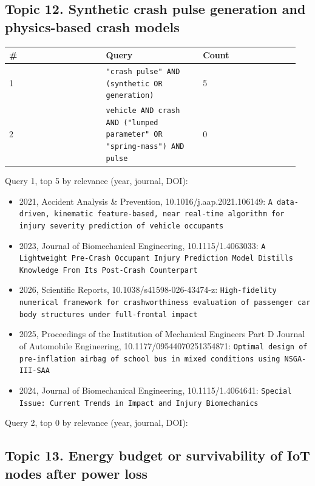 \subsection*{Topic 12. Synthetic crash pulse generation and physics-based crash models}

{\scriptsize\raggedright
\begin{longtable}{p{0.317\linewidth}p{0.317\linewidth}p{0.317\linewidth}}
\toprule
\# & Query & Count \\
\midrule
\endhead
1 & \texttt{"crash pulse" AND (synthetic OR generation)} & 5 \\
2 & \texttt{vehicle AND crash AND ("lumped parameter" OR "spring-mass") AND pulse} & 0 \\
\bottomrule
\end{longtable}}

Query 1, top 5 by relevance (year, journal, DOI):

\begin{itemize}
\item 2021, Accident Analysis \& Prevention, 10.1016/j.aap.2021.106149: \texttt{A data-driven, kinematic feature-based, near real-time algorithm for injury severity prediction of vehicle occupants}
\item 2023, Journal of Biomechanical Engineering, 10.1115/1.4063033: \texttt{A Lightweight Pre-Crash Occupant Injury Prediction Model Distills Knowledge From Its Post-Crash Counterpart}
\item 2026, Scientific Reports, 10.1038/s41598-026-43474-z: \texttt{High-fidelity numerical framework for crashworthiness evaluation of passenger car body structures under full-frontal impact}
\item 2025, Proceedings of the Institution of Mechanical Engineers Part D Journal of Automobile Engineering, 10.1177/09544070251354871: \texttt{Optimal design of pre-inflation airbag of school bus in mixed conditions using NSGA-III-SAA}
\item 2024, Journal of Biomechanical Engineering, 10.1115/1.4064641: \texttt{Special Issue: Current Trends in Impact and Injury Biomechanics}
\end{itemize}

Query 2, top 0 by relevance (year, journal, DOI):


\subsection*{Topic 13. Energy budget or survivability of IoT nodes after power loss}

